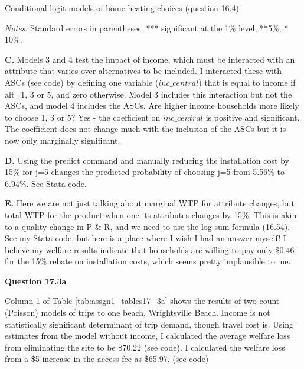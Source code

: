 \documentclass[12pt]{article}
\begin{document}
\singlespace
\begin{threeparttable}[h]  
\caption{Conditional logit models of home heating choices (question 16.4)}
{\label{tab:assgn1_tables16_4}}
\small

\begin{tablenotes}
\footnotesize
\item \emph{Notes:} Standard errors in parentheses. *** significant at the 1\% level, **5\%, * 10\%.   \\
\end{tablenotes}
\end{threeparttable}
\doublespace


 \textbf{C.}  Models 3 and 4 test the impact of income, which must be interacted with an attribute that varies over alternatives to be included.  I interacted these with ASCs (see code) by defining one variable ($inc\_central$) that is equal to income if alt=1, 3 or 5, and zero otherwise.  Model 3 includes this interaction but not the ASCs, and model 4 includes the ASCs.  Are higher income households more likely to choose 1, 3 or 5?  Yes - the coefficient on $inc\_central$ is positive and significant.  The coefficient does not change much with the inclusion of the ASCs but it is now only marginally significant.

 \textbf{D.}  Using the predict command and manually reducing the installation cost by 15\% for j=5 changes the predicted probability of choosing j=5 from 5.56\% to 6.94\%.  See Stata code.


 \textbf{E.}  Here we are not just talking about marginal WTP for attribute changes, but total WTP for the product when one its attributes changes by 15\%.  This is akin to a quality change in P \& R, and we need to use the log-sum formula (16.54).  See my Stata code, but here is a place where I wish I had an answer myself!  I believe my welfare results indicate that households are willing to pay only \$0.46 for the 15\% rebate on installation costs, which seems pretty implausible to me. 




\textbf{Question 17.3a}

Column 1 of Table \ref{tab:assgn1_tables17_3a} shows the results of two count (Poisson) models of trips to one beach, Wrightsville Beach.  Income is not statistically significant determinant of trip demand, though travel cost is.  Using estimates from the model without income, I calculated the average welfare loss from eliminating the site to be \$70.22 (see code). I calculated the welfare loss from a \$5 increase in the access fee as \$65.97. (see code)
\end{document}
